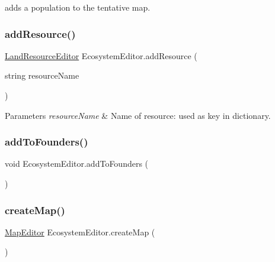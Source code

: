 adds a population to the tentative map. 

\mbox{\label{class_ecosystem_editor_a8473ee588e7e2201b6c57bd7204ec803}} 
\subsubsection{\texorpdfstring{add\+Resource()}{addResource()}}
{\footnotesize\ttfamily \mbox{\hyperlink{class_land_resource_editor}{Land\+Resource\+Editor}} Ecosystem\+Editor.\+add\+Resource (\begin{DoxyParamCaption}\item[{string}]{resource\+Name }\end{DoxyParamCaption})}




\begin{DoxyParams}{Parameters}
{\em resource\+Name} & Name of resource\+: used as key in dictionary.\\
\hline
\end{DoxyParams}


\mbox{\label{class_ecosystem_editor_a22b8b780750a21d6b893e417f623ba30}} 
\subsubsection{\texorpdfstring{add\+To\+Founders()}{addToFounders()}}
{\footnotesize\ttfamily void Ecosystem\+Editor.\+add\+To\+Founders (\begin{DoxyParamCaption}{ }\end{DoxyParamCaption})}

\mbox{\label{class_ecosystem_editor_a34ac5bdf72932adfbdf5758a8f42a836}} 
\subsubsection{\texorpdfstring{create\+Map()}{createMap()}}
{\footnotesize\ttfamily \mbox{\hyperlink{class_map_editor}{Map\+Editor}} Ecosystem\+Editor.\+create\+Map (\begin{DoxyParamCaption}{ }\end{DoxyParamCaption})}

